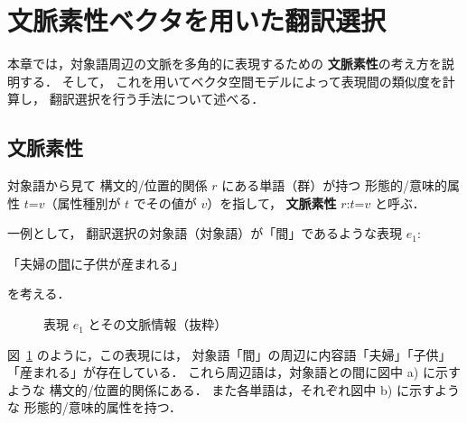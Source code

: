 \section{文脈素性ベクタを用いた翻訳選択}
\label{sec:method}
本章では，対象語周辺の文脈を多角的に表現するための
{\bf 文脈素性}の考え方を説明する．
そして，
これを用いてベクタ空間モデルによって表現間の類似度を計算し，
翻訳選択を行う手法について述べる．


\subsection{文脈素性}
対象語から見て
構文的/位置的関係 $r$ にある単語（群）が持つ
形態的/意味的属性 $t$=$v$（属性種別が $t$ でその値が $v$）を指して，
{\bf 文脈素性} $r$:$t$=$v$ と呼ぶ．

一例として，
翻訳選択の対象語（対象語）が「間」であるような表現 $e_1$:
\begin{center}
「夫婦の\mbox{}\underline{間}\mbox{}に子供が産まれる」 
\end{center}
を考える．
\begin{figure}[tp]
 \begin{center}
 \end{center}
 \caption{表現 $e_1$ とその文脈情報（抜粋）}
 \label{fig:expression-j}
\end{figure}
図~\ref{fig:expression-j} のように，この表現には，
対象語「間」の周辺に内容語「夫婦」「子供」「産まれる」が存在している．
これら周辺語は，対象語との間に図中 {\sf a)} に示すような
構文的/位置的関係にある．
また各単語は，それぞれ図中 {\sf b)} に示すような
形態的/意味的属性を持つ．

